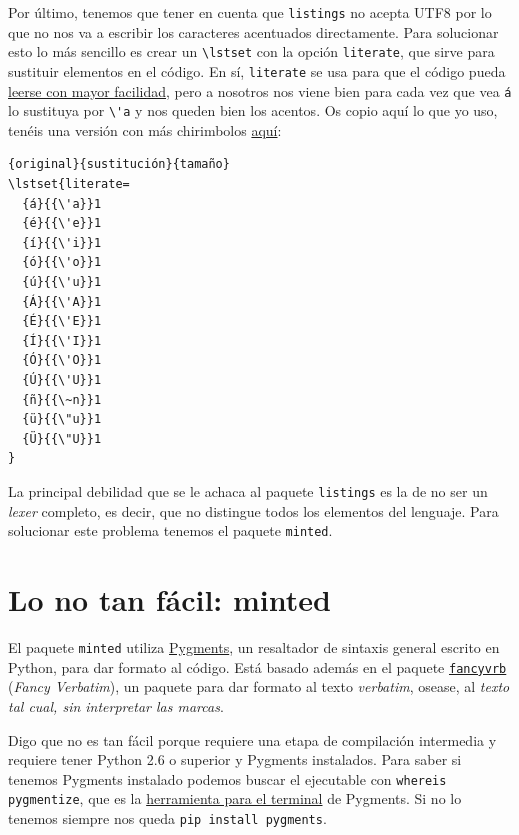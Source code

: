 Por último, tenemos que tener en cuenta que \lstinline!listings! no
acepta UTF8 por lo que no nos va a escribir los caracteres acentuados
directamente. Para solucionar esto lo más sencillo es crear un
\lstinline!\lstset! con la opción \lstinline!literate!, que sirve para
sustituir elementos en el código. En sí, \lstinline!literate! se usa
para que el código pueda
\href{https://en.wikipedia.org/wiki/Literate_programming}{leerse con
mayor facilidad}, pero a nosotros nos viene bien para cada vez que vea
\lstinline!á! lo sustituya por \lstinline!\'a! y nos queden bien los
acentos. Os copio aquí lo que yo uso, tenéis una versión con más
chirimbolos
\href{https://en.wikibooks.org/wiki/LaTeX/Source_Code_Listings\#Encoding_issue}{aquí}:

\begin{lstlisting}[language={[latex]tex}]
% Listings no acepta UTF8
{original}{sustitución}{tamaño}
\lstset{literate=
  {á}{{\'a}}1
  {é}{{\'e}}1
  {í}{{\'i}}1
  {ó}{{\'o}}1
  {ú}{{\'u}}1
  {Á}{{\'A}}1
  {É}{{\'E}}1
  {Í}{{\'I}}1
  {Ó}{{\'O}}1
  {Ú}{{\'U}}1
  {ñ}{{\~n}}1
  {ü}{{\"u}}1
  {Ü}{{\"U}}1
}
\end{lstlisting}

La principal debilidad que se le achaca al paquete \lstinline!listings!
es la de no ser un \emph{lexer} completo, es decir, que no distingue
todos los elementos del lenguaje. Para solucionar este problema tenemos
el paquete \lstinline!minted!.

\section{Lo no tan fácil: minted}

El paquete \lstinline!minted! utiliza
\href{http://pygments.org/}{Pygments}, un resaltador de sintaxis general
escrito en Python, para dar formato al código. Está basado además en el
paquete \href{http://www.ctan.org/pkg/fancyvrb}{\lstinline!fancyvrb!}
(\emph{Fancy Verbatim}), un paquete para dar formato al texto
\emph{verbatim}, osease, al \emph{texto tal cual, sin interpretar las
marcas}.

Digo que no es tan fácil porque requiere una etapa de compilación
intermedia y requiere tener Python 2.6 o superior y Pygments instalados.
Para saber si tenemos Pygments instalado podemos buscar el ejecutable
con \lstinline!whereis pygmentize!, que es la
\href{http://pygments.org/docs/cmdline/}{herramienta para el terminal}
de Pygments. Si no lo tenemos siempre nos queda
\lstinline!pip install pygments!.

